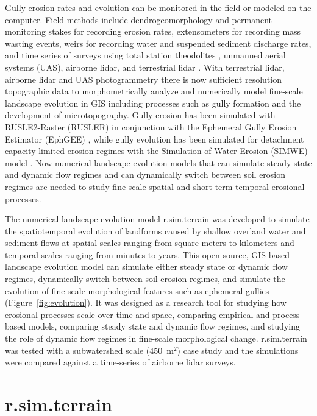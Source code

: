 \documentclass[gmd, manuscript]{copernicus}
\begin{document}
Gully erosion rates and evolution
can be monitored in the field 
or modeled on the computer. 
Field methods include
dendrogeomorphology \citep{Malik2008} and 
permanent monitoring stakes for recording erosion rates, 
extensometers for recording mass wasting events, 
weirs for recording water and suspended sediment discharge rates, 
and time series of surveys using 
total station theodolites \citep{Thomas2004},
unmanned aerial systems (UAS),
airborne lidar, and terrestrial lidar \citep{Starek2011,Bechet2016}.
With terrestrial lidar, airborne lidar and 
UAS photogrammetry
there is now sufficient resolution topographic data 
to morphometrically analyze and 
numerically model fine-scale landscape evolution in GIS
including processes such as gully formation 
and the development of microtopography. 
Gully erosion has been simulated with 
RUSLE2-Raster (RUSLER)
in conjunction with the Ephemeral Gully Erosion Estimator (EphGEE)
\citep{Dabney2014},
while gully evolution
has been simulated for detachment capacity limited erosion regimes
with the Simulation of Water Erosion (SIMWE) model
\citep{Koco2011, Mitasova2013}. 
Now numerical landscape evolution models 
that can simulate 
steady state and dynamic flow regimes
and can dynamically switch between soil erosion regimes 
are needed to study 
fine-scale spatial and short-term temporal erosional processes.

The numerical landscape evolution model 
r.sim.terrain was developed to 
simulate the spatiotemporal evolution of landforms
caused by shallow overland water and sediment flows
at spatial scales ranging from
square meters to kilometers
and temporal scales ranging from minutes to years. 
This open source, GIS-based landscape evolution model can
simulate either steady state or dynamic flow regimes, 
dynamically switch between soil erosion regimes, and
simulate the evolution of fine-scale morphological features 
such as ephemeral gullies
(Figure~\ref{fig:evolution}).
It was designed as a research tool for
studying how erosional processes scale over time and space,
comparing empirical and process-based models, 
comparing steady state and dynamic flow regimes, and
studying the role of dynamic flow regimes 
in fine-scale morphological change. 
r.sim.terrain was tested with 
a subwatershed scale (450~\unit{m}$^{2}$) case study
and the simulations were compared against 
a time-series of airborne lidar surveys.

\section{r.sim.terrain}
\end{document}
